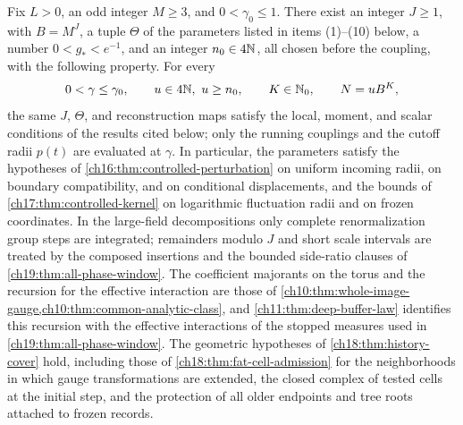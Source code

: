 \begin{theorem}\label{ch20:thm:common-parameters}
Fix $L>0$, an odd integer $M\ge3$, and $0<\gamma_0\le1$. There exist an integer $J\ge1$, with $B=M^J$, a tuple $\Theta$ of the parameters listed in items \textup{(1)}--\textup{(10)} below, a number $0<g_*<e^{-1}$, and an integer $n_0\in4\mathbb N$, all chosen before the coupling, with the following property. For every
\[
 0<\gamma\le\gamma_0,\qquad u\in4\mathbb N,\ u\ge n_0,\qquad K\in\mathbb N_0,\qquad N=uB^K,
\]
the same $J$, $\Theta$, and reconstruction maps satisfy the local, moment, and scalar conditions of the results cited below; only the running couplings and the cutoff radii $p(t)$ are evaluated at $\gamma$. In particular, the parameters satisfy the hypotheses of \cref{ch16:thm:controlled-perturbation} on uniform incoming radii, on boundary compatibility, and on conditional displacements, and the bounds of \cref{ch17:thm:controlled-kernel} on logarithmic fluctuation radii and on frozen coordinates. In the large-field decompositions only complete renormalization group steps are integrated; remainders modulo $J$ and short scale intervals are treated by the composed insertions and the bounded side-ratio clauses of \cref{ch19:thm:all-phase-window}. The coefficient majorants on the torus and the recursion for the effective interaction are those of \cref{ch10:thm:whole-image-gauge,ch10:thm:common-analytic-class}, and \cref{ch11:thm:deep-buffer-law} identifies this recursion with the effective interactions of the stopped measures used in \cref{ch19:thm:all-phase-window}. The geometric hypotheses of \cref{ch18:thm:history-cover} hold, including those of \cref{ch18:thm:fat-cell-admission} for the neighborhoods in which gauge transformations are extended, the closed complex of tested cells at the initial step, and the protection of all older endpoints and tree roots attached to frozen records.


\end{theorem}

